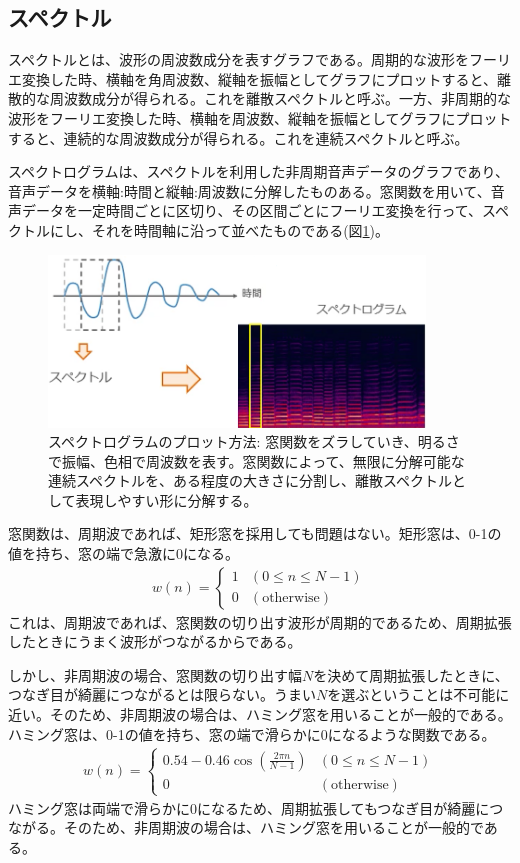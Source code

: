 \documentclass{ltjsarticle}
\begin{document}
\subsection{スペクトル}
スペクトルとは、波形の周波数成分を表すグラフである。周期的な波形をフーリエ変換した時、横軸を角周波数、縦軸を振幅としてグラフにプロットすると、離散的な周波数成分が得られる。これを離散スペクトルと呼ぶ。一方、非周期的な波形をフーリエ変換した時、横軸を周波数、縦軸を振幅としてグラフにプロットすると、連続的な周波数成分が得られる。これを連続スペクトルと呼ぶ。
\par
スペクトログラムは、スペクトルを利用した非周期音声データのグラフであり、音声データを横軸:時間と縦軸:周波数に分解したものある。窓関数を用いて、音声データを一定時間ごとに区切り、その区間ごとにフーリエ変換を行って、スペクトルにし、それを時間軸に沿って並べたものである(図\ref{fig:Spectrogram})。
\begin{figure}
  \centering
  \includegraphics[width=10cm]{./capture/Spectrogram.png}
  \caption{スペクトログラムのプロット方法: 窓関数をズラしていき、明るさで振幅、色相で周波数を表す。窓関数によって、無限に分解可能な連続スペクトルを、ある程度の大きさに分割し、離散スペクトルとして表現しやすい形に分解する。}
  \label{fig:Spectrogram}
\end{figure}
\par
窓関数は、周期波であれば、矩形窓を採用しても問題はない。矩形窓は、0-1の値を持ち、窓の端で急激に0になる。
\begin{align}
  w(n) = 
  \begin{cases}
    1 & (0 \leq n \leq N-1)\\
    0 & (\text{otherwise})
  \end{cases}
\end{align}
これは、周期波であれば、窓関数の切り出す波形が周期的であるため、周期拡張したときにうまく波形がつながるからである。
\par
しかし、非周期波の場合、窓関数の切り出す幅$N$を決めて周期拡張したときに、つなぎ目が綺麗につながるとは限らない。うまい$N$を選ぶということは不可能に近い。そのため、非周期波の場合は、ハミング窓を用いることが一般的である。ハミング窓は、0-1の値を持ち、窓の端で滑らかに0になるような関数である。
\begin{align}
  w(n) =
  \begin{cases}
    0.54 - 0.46\cos\left(\frac{2\pi n}{N-1}\right) & (0 \leq n \leq N-1)\\
    0 & (\text{otherwise})
  \end{cases}
\end{align}
ハミング窓は両端で滑らかに0になるため、周期拡張してもつなぎ目が綺麗につながる。そのため、非周期波の場合は、ハミング窓を用いることが一般的である。
\end{document}
